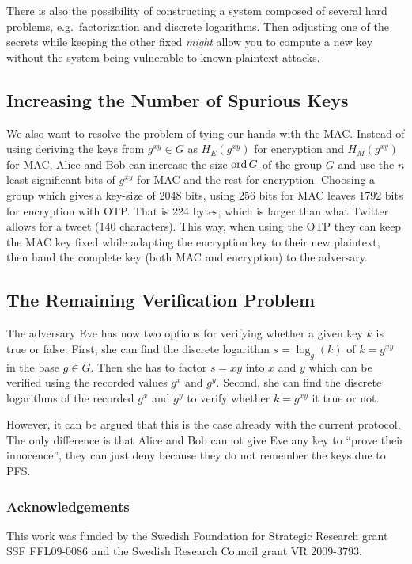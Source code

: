 {There is also the possibility of constructing a system composed of several hard 
problems, e.g.~factorization and discrete logarithms.
Then adjusting one of the secrets while keeping the other fixed \emph{might} 
allow you to compute a new key without the system being vulnerable to 
known-plaintext attacks.

\subsection{Increasing the Number of Spurious Keys}

We also want to resolve the problem of tying our hands with the \ac{MAC}.
Instead of using deriving the keys from \(g^{xy}\in G\) as \(H_E(g^{xy})\) for 
encryption and \(H_M(g^{xy})\) for \ac{MAC}, Alice and Bob can increase the 
size \(\operatorname{ord} G\) of the group \(G\) and use the \(n\) least significant bits of 
\(g^{xy}\) for \ac{MAC} and the rest for encryption.
Choosing a group which gives a key-size of 2048 bits, using 256 bits for 
\ac{MAC} leaves 1792 bits for encryption with \ac{OTP}.
That is 224 bytes, which is larger than what Twitter allows for a tweet (140 
characters).
This way, when using the \ac{OTP} they can keep the \ac{MAC} key fixed while 
adapting the encryption key to their new plaintext, then hand the complete key 
(both \ac{MAC} and encryption) to the adversary.

\subsection{The Remaining Verification Problem}

The adversary Eve has now two options for verifying whether a given key \(k\) 
is true or false.
First, she can find the discrete logarithm \(s = \log_g( k )\) of \(k 
= g^{xy}\) in the base \(g\in G\).
Then she has to factor \(s = xy\) into \(x\) and \(y\) which can be verified 
using the recorded values \(g^x\) and \(g^y\).
Second, she can find the discrete logarithms of the recorded \(g^x\) and 
\(g^y\) to verify whether \(k = g^{xy}\) it true or not.

However, it can be argued that this is the case already with the current 
protocol.
The only difference is that Alice and Bob cannot give Eve any key to 
\enquote{prove their innocence}, they can just deny because they do not 
remember the keys due to \ac{PFS}.


\subsubsection*{Acknowledgements}

This work was funded by the Swedish Foundation for Strategic Research grant SSF 
FFL09-0086 and the Swedish Research Council grant VR 2009-3793.
}


\begin{frame}
\printbibliography{}
\end{frame}
